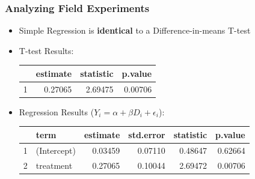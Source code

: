 \documentclass[xcolor=x11names,compress]{beamer}\usepackage[]{graphicx}\usepackage[]{color}
\renewcommand{\(}{\begin{columns}}
\renewcommand{\)}{\end{columns}}
\newcommand{\<}[1]{\begin{column}{#1}}
\renewcommand{\>}{\end{column}}
\begin{document}
\begin{frame}
\frametitle{Analyzing Field Experiments}
\begin{itemize}
\item Simple Regression is \textbf{identical} to a Difference-in-means T-test
\footnotesize
\item T-test Results:
\begin{table}[ht]
\centering
\begin{tabular}{rrrr}
  \hline
 & estimate & statistic & p.value \\ 
  \hline
1 & 0.27065 & 2.69475 & 0.00706 \\ 
   \hline
\end{tabular}
\end{table}

\pause
\item Regression Results ($Y_i = \alpha + \beta D_i + \epsilon_i$):
\begin{table}[ht]
\centering
\begin{tabular}{rlrrrr}
  \hline
 & term & estimate & std.error & statistic & p.value \\ 
  \hline
1 & (Intercept) & 0.03459 & 0.07110 & 0.48647 & 0.62664 \\ 
  2 & treatment & 0.27065 & 0.10044 & 2.69472 & 0.00706 \\ 
   \hline
\end{tabular}
\end{table}

\end{itemize}
\normalsize
\end{frame}
\end{document}
